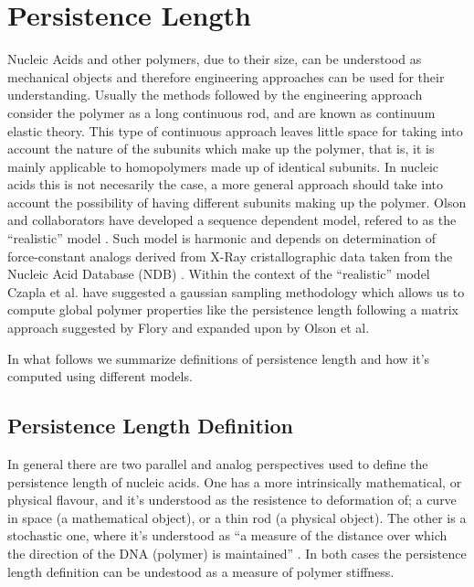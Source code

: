 \chapter{Persistence Length}
\label{appendix4a}

Nucleic Acids and other polymers, due to their size, can be understood
as  mechanical  objects  \cite{marko2003,  nelson2004}  and  therefore
engineering approaches  can be used for  their understanding.  Usually
the methods followed by  the engineering approach consider the polymer
as  a  long  continuous  rod,  and  are  known  as  continuum  elastic
theory.  This type  of  continuous approach  leaves  little space  for
taking  into account  the nature  of the  subunits which  make  up the
polymer, that is,  it is mainly applicable to  homopolymers made up of
identical subunits. In nucleic acids  this is not necesarily the case,
a more  general approach should  take into account the  possibility of
having  different   subunits  making   up  the  polymer.    Olson  and
collaborators have developed a sequence dependent model, refered to as
the ``realistic'' model \cite{olson1993}.   Such model is harmonic and
depends on determination of  force-constant analogs derived from X-Ray
cristallographic  data  taken from  the  Nucleic  Acid Database  (NDB)
\cite{go1976,  olson1998}.  Within  the context  of  the ``realistic''
model  Czapla  et al.   \cite{czapla2006}  have  suggested a  gaussian
sampling  methodology  which  allows  us  to  compute  global  polymer
properties  like  the  persistence  length  following  a  matrix
approach  suggested by  Flory  \cite{flory1969} and  expanded upon  by
Olson et al. \cite{maroun1988a, marky1994a}

In what follows we summarize definitions of persistence length and how
it's computed using different models.

\section{Persistence Length Definition}
In  general there  are two  parallel and  analog perspectives  used to
define  the persistence  length  of  nucleic acids.   One  has a  more
intrinsically mathematical,  or physical flavour,  and it's understood
as the resistence to deformation  of; a curve in space (a mathematical
object), or a thin rod (a physical object).  The other is a stochastic
one, where it's  understood as ``a measure of  the distance over which
the direction  of the DNA (polymer)  is maintained'' \cite{olson1995}.
In both cases the persistence  length definition can be undestood as a
measure of polymer stiffness.

